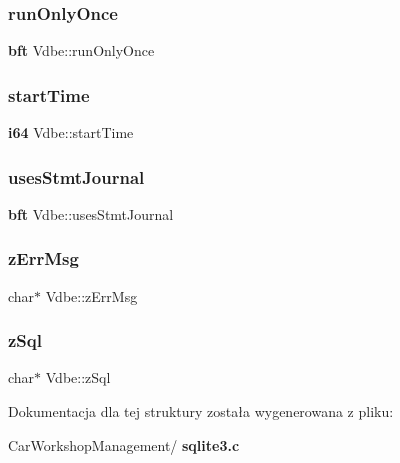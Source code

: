 \mbox{\label{struct_vdbe_a8a721c9051a913cc59d546de68dfd91c}} 
\subsubsection{runOnlyOnce}
{\footnotesize\ttfamily \textbf{ bft} Vdbe\+::run\+Only\+Once}

\mbox{\label{struct_vdbe_a1de76a5c58ed36608a163bfdc2e9e8b7}} 
\subsubsection{startTime}
{\footnotesize\ttfamily \textbf{ i64} Vdbe\+::start\+Time}

\mbox{\label{struct_vdbe_a4d1f6dfd3a6c17fa28e9ad1eac8e4839}} 
\subsubsection{usesStmtJournal}
{\footnotesize\ttfamily \textbf{ bft} Vdbe\+::uses\+Stmt\+Journal}

\mbox{\label{struct_vdbe_add7679059dd1e3cd483ddcb9153ca844}} 
\subsubsection{zErrMsg}
{\footnotesize\ttfamily char$\ast$ Vdbe\+::z\+Err\+Msg}

\mbox{\label{struct_vdbe_a5a61fd8f84ae0399ef73327e48048ae9}} 
\subsubsection{zSql}
{\footnotesize\ttfamily char$\ast$ Vdbe\+::z\+Sql}



Dokumentacja dla tej struktury została wygenerowana z pliku\+:\begin{DoxyCompactItemize}
\item 
Car\+Workshop\+Management/\textbf{ sqlite3.\+c}\end{DoxyCompactItemize}
